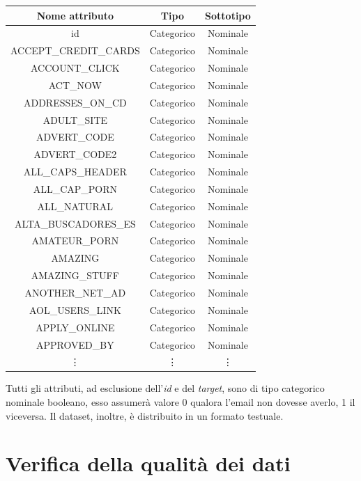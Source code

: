\begin{table}[hbtp]
	\begin{tabular}{ c | c | c}
		\textbf{Nome attributo} & \textbf{Tipo} & \textbf{Sottotipo} \\
		\hline
		id & Categorico & Nominale \\ 
		ACCEPT\_CREDIT\_CARDS & Categorico & Nominale \\ 
		ACCOUNT\_CLICK & Categorico & Nominale \\ 
		ACT\_NOW & Categorico & Nominale \\ 
		ADDRESSES\_ON\_CD & Categorico & Nominale \\ 
		ADULT\_SITE & Categorico & Nominale \\ 
		ADVERT\_CODE & Categorico & Nominale \\ 
		ADVERT\_CODE2 & Categorico & Nominale \\ 
		ALL\_CAPS\_HEADER & Categorico & Nominale \\ 
		ALL\_CAP\_PORN & Categorico & Nominale \\ 
		ALL\_NATURAL & Categorico & Nominale \\ 
		ALTA\_BUSCADORES\_ES & Categorico & Nominale \\ 
		AMATEUR\_PORN & Categorico & Nominale \\ 
		AMAZING & Categorico & Nominale \\ 
		AMAZING\_STUFF & Categorico & Nominale \\ 
		ANOTHER\_NET\_AD & Categorico & Nominale \\ 
		AOL\_USERS\_LINK & Categorico & Nominale \\ 
		APPLY\_ONLINE & Categorico & Nominale \\ 
		APPROVED\_BY & Categorico & Nominale \\ 
		\vdots  &  \vdots  &  \vdots  \\
	\end{tabular}
\end{table}

Tutti gli attributi, ad esclusione dell'\textit{id} e del \textit{target}, sono di tipo categorico nominale booleano, esso assumerà valore 0 qualora l'email non dovesse averlo, 1 il viceversa.
Il dataset, inoltre, è distribuito in un formato testuale.


\section{Verifica della qualità dei dati}

